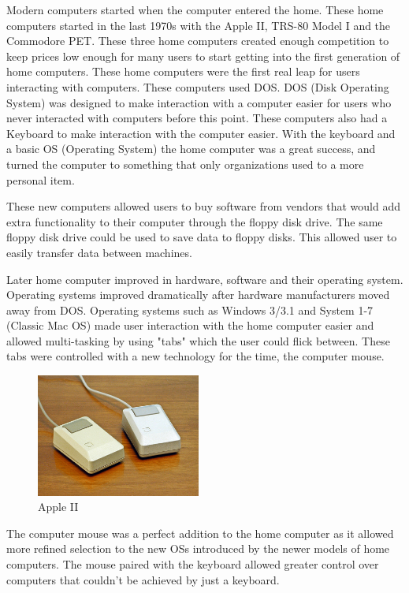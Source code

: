 Modern computers started when the computer entered the home. \cite{homecomputers} These home computers started in the last 1970s with the Apple II, TRS-80 Model I and the Commodore PET. These three home computers created enough competition to keep prices low enough for many users to start getting into the first generation of home computers. These home computers were the first real leap for users interacting with computers. These computers used DOS. \cite{dos} DOS (Disk Operating System) was designed to make interaction with a computer easier for users who never interacted with computers before this point. These computers also had a Keyboard to make interaction with the computer easier. With the keyboard and a basic OS (Operating System) the home computer was a great success, and turned the computer to something that only organizations used to a more personal item.

These new computers allowed users to buy software from vendors that would add extra functionality to their computer through the floppy disk drive. The same floppy disk drive could be used to save data to floppy disks. This allowed user to easily transfer data between machines.

Later home computer improved in hardware, software and their operating system. Operating systems improved dramatically after hardware manufacturers moved away from DOS. Operating systems such as Windows 3/3.1 and System 1-7 (Classic Mac OS) made user interaction with the home computer easier and allowed multi-tasking by using "tabs" which the user could flick between. These tabs were controlled with a new technology for the time, the computer mouse. 

\begin{figure}
  \begin{center}
    \includegraphics[width=0.48\textwidth]{img/mouse.jpg}
  \end{center}
  \caption{Apple II}
\end{figure}

The computer mouse was a perfect addition to the home computer as it allowed more refined selection to the new OSs introduced by the newer models of home computers. The mouse paired with the keyboard allowed greater control over computers that couldn't be achieved by just a keyboard. 

